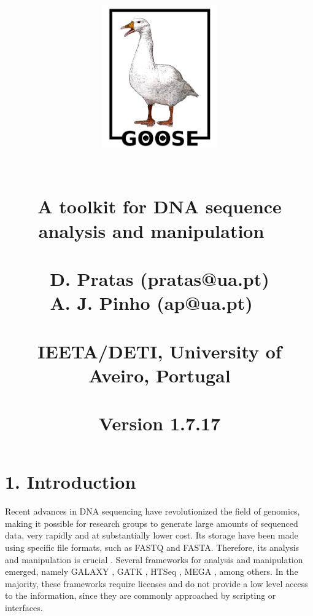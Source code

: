 \documentclass[11pt,journal,compsoc]{report}[1]
\begin{document}

\title{
%
\begin{figure}[h!]
\centerline{\includegraphics[width=5cm]{../imgs/logo.pdf}}
\label{logo}
\end{figure}
~\\
\textbf{A toolkit for DNA sequence\\ analysis and manipulation}
~\\~\\
\large
D. Pratas (pratas@ua.pt)\\
A. J. Pinho (ap@ua.pt)
~\\~\\
\small
IEETA/DETI, University of Aveiro, Portugal\\
~\\
Version 1.7.17
}
\date{}
\maketitle

\tableofcontents

\chapter*{1. Introduction}
\label{intro}

Recent advances in {DNA} sequencing have revolutionized the field of genomics,
making it possible for research groups to generate large amounts of sequenced
data, very rapidly and at substantially lower cost. Its storage have been
made using specific file formats, such as FASTQ and FASTA. Therefore, its
analysis and manipulation is crucial \cite{Buermans-2014a}. Several
frameworks for analysis and manipulation emerged, namely GALAXY
\cite{Giardine-2005a}, GATK \cite{DePristo-2011a}, HTSeq
\cite{Anders-2014a}, MEGA \cite{Kumar-2016a}, among others.
In the majority, these frameworks require licenses and do not provide
a low level access to the information, since they are commonly approached
by scripting or interfaces.
\end{document}
